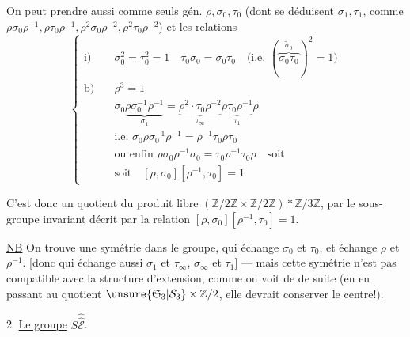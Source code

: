 
On peut prendre aussi comme seuls gén. $\rho,\sigma_0,\tau_0$ (dont se déduisent $\sigma_1,\tau_1$, \inserted{$\sigma_\infty,\tau_\infty$,} comme $\rho\sigma_0\rho^{-1},\rho\tau_0\rho^{-1},\rho^2\sigma_0\rho^{-2},\rho^2\tau_0\rho^{-2}$) et les relations
\[
\left\{\begin{aligned}
\text{i)}\quad&\sigma_0^2=\tau_0^2=1\quad\tau_0\sigma_0=\sigma_0\tau_0\quad\text{(i.e. }(\overbrace{\sigma_0\tau_0}^{\tilde\sigma_0})^2=1\text{)}\\
\text{b)}\quad&\rho^3=1\\
&\sigma_0\underbrace{\rho\sigma_0^{-1}\rho^{-1}}_{\sigma_1}=\underbrace{\rho^2\cdot\tau_0\rho^{-2}}_{\tau_\infty}\underbrace{\rho\tau_0\rho^{-1}}_{\tau_1}\rho\\
&\text{i.e. }\sigma_0\rho\sigma_0^{-1}\rho^{-1}=\rho^{-1}\tau_0\rho\tau_0\\
&\text{ou enfin }\rho\sigma_0\rho^{-1}\sigma_0=\tau_0\rho^{-1}\tau_0\rho\quad\text{soit}\\
&\text{soit}\quad[\rho,\sigma_0][\rho^{-1},\tau_0]=1
\end{aligned}\right.
\]

C'est donc un quotient du produit libre $(\mathbb Z/2\mathbb Z\times\mathbb Z/2\mathbb Z)*\mathbb Z/3\mathbb Z$, par le sous-groupe invariant décrit par la relation $[\rho,\sigma_0][\rho^{-1},\tau_0]=1$.

\uline{NB} On trouve une symétrie dans le groupe, qui échange $\sigma_0$ et $\tau_0$, et échange $\rho$ et $\rho^{-1}$. [donc qui échange aussi $\sigma_1$ et $\tau_\infty$, $\sigma_\infty$ et $\tau_1$] --- mais cette symétrie n'est pas compatible avec la structure d'extension, comme on voit de  de suite (en\unsure{:|;} en passant au quotient $\unsure{\mathfrak S_3|\mathcal S_3}\times\mathbb Z/2$, elle devrait conserver le centre!).

\textcircled{2} \uline{Le groupe} $S\widehat{\widehat{\mathcal E}}$.

